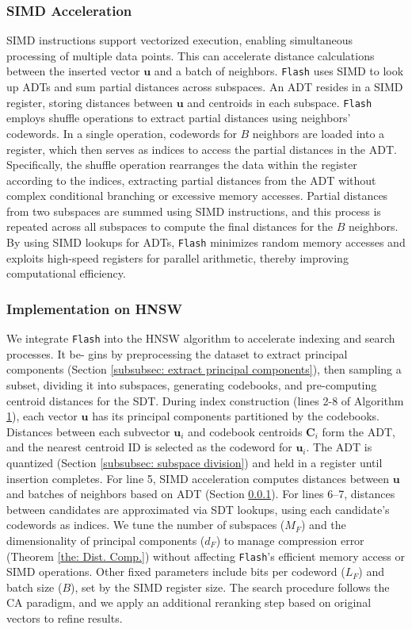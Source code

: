 \subsubsection{\textbf{SIMD Acceleration}}
\label{subsubsec: simd acceler}
SIMD instructions support vectorized execution, enabling simultaneous processing of multiple data points. This can accelerate distance calculations between the inserted vector $\boldsymbol{u}$ and a batch of neighbors. \texttt{Flash} uses SIMD to look up ADTs and sum partial distances across subspaces. An ADT resides in a SIMD register, storing distances between $\boldsymbol{u}$ and centroids in each subspace. \texttt{Flash} employs shuffle operations to extract partial distances using neighbors’ codewords. In a single operation, codewords for $B$ neighbors are loaded into a register, which then serves as indices to access the partial distances in the ADT. Specifically, the shuffle operation rearranges the data within the register according to the indices, extracting partial distances from the ADT without complex conditional branching or excessive memory accesses. Partial distances from two subspaces are summed using SIMD instructions, and this process is repeated across all subspaces to compute the final distances for the $B$ neighbors. By using SIMD lookups for ADTs, \texttt{Flash} minimizes random memory accesses and exploits high-speed registers for parallel arithmetic, thereby improving computational efficiency.

\subsubsection{\textbf{Implementation on HNSW}}
\label{subsubsec: hnsw-flash}
We integrate \texttt{Flash} into the HNSW algorithm to accelerate indexing and search processes. It be- gins by preprocessing the dataset to extract principal components (Section \ref{subsubsec: extract principal components}), then sampling a subset, dividing it into subspaces, generating codebooks, and pre-computing centroid distances for the SDT. During index construction (lines 2-8 of Algorithm \hyperref[alg: hnsw construction]{1}), each vector $\boldsymbol{u}$ has its principal components partitioned by the codebooks. Distances between each subvector $\boldsymbol{u}_i$ and codebook centroids $\boldsymbol{C}_i$ form the ADT, and the nearest centroid ID is selected as the codeword for $\boldsymbol{u}_i$. The ADT is quantized (Section \ref{subsubsec: subspace division}) and held in a register until insertion completes. For line 5, SIMD acceleration computes distances between $\boldsymbol{u}$ and batches of neighbors based on ADT (Section \ref{subsubsec: simd acceler}). For lines 6–7, distances between candidates are approximated via SDT lookups, using each candidate’s codewords as indices. We tune the number of subspaces ($M_F$) and the dimensionality of principal components ($d_F$) to manage compression error (Theorem \ref{the: Dist. Comp.}) without affecting \texttt{Flash}’s efficient memory access or SIMD operations. Other fixed parameters include bits per codeword ($L_F$) and batch size ($B$), set by the SIMD register size. The search procedure follows the CA paradigm, and we apply an additional reranking step based on original vectors to refine results.

